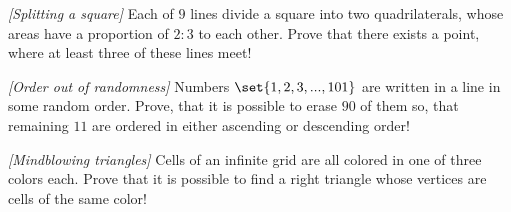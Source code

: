 \begin{problem}
\textit{[Splitting a square]}
Each of $9$ lines divide a square into two quadrilaterals, whose areas have a proportion of $2:3$ to each other. Prove that there exists a point, where at least three of these lines meet!
\end{problem}
%

\begin{problem}
\textit{[Order out of randomness]}
Numbers $\set{1,2,3,...,101}$ are written in a line in some random order. Prove, that it is possible to erase $90$ of them so, that remaining $11$ are ordered in either ascending or descending order!
\end{problem}
%

\begin{problem}
\textit{[Mindblowing triangles]}
Cells of an infinite grid are all colored in one of three colors each. Prove that it is possible to find a right triangle whose vertices are cells of the same color!
\end{problem}
%

